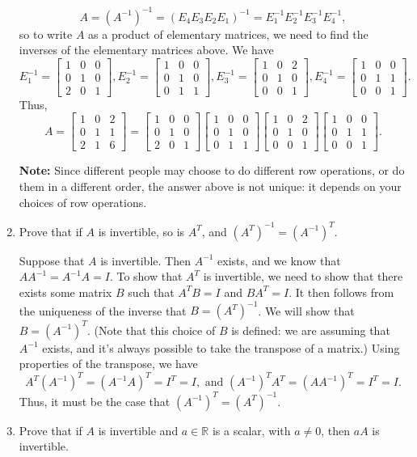 \documentclass[12pt]{article}
\newcommand{\R}{\mathbb{R}}
\newcommand{\bbm}{\begin{bmatrix}}
\newcommand{\ebm}{\end{bmatrix}}
\begin{document}
\begin{enumerate}
\[
 A = (A^{-1})^{-1} = (E_4E_3E_2E_1)^{-1} = E_1^{-1}E_2^{-1}E_3^{-1}E_4^{-1},
\]
so to write $A$ as a product of elementary matrices, we need to find the inverses of the elementary matrices above. We have
\[
 E_1^{-1} = \bbm 1&0&0\\0&1&0\\2&0&1\ebm, E_2^{-1} = \bbm 1&0&0\\0&1&0\\0&1&1\ebm, E_3^{-1} = \bbm 1&0&2\\0&1&0\\0&0&1\ebm, E_4^{-1} = \bbm 1&0&0\\0&1&1\\0&0&1\ebm.
\]
Thus,
\[
 A = \bbm 1&0&2\\0&1&1\\2&1&6\ebm = \bbm 1&0&0\\0&1&0\\2&0&1\ebm \bbm 1&0&0\\0&1&0\\0&1&1\ebm \bbm 1&0&2\\0&1&0\\0&0&1\ebm \bbm 1&0&0\\0&1&1\\0&0&1\ebm.
\]

\textbf{Note:}  Since different people may choose to do different row operations, or do them in a different order, the answer above is not unique: it depends on your choices of row operations.


\item Prove that if $A$ is invertible, so is $A^T$, and $(A^T)^{-1} = (A^{-1})^T$.

\medskip

Suppose that $A$ is invertible. Then $A^{-1}$ exists, and we know that $AA^{-1}=A^{-1}A=I$. To show that $A^T$ is invertible, we need to show that there exists some matrix $B$ such that $A^TB = I$ and $BA^T=I$. It then follows from the uniqueness of the inverse that $B=(A^T)^{-1}$. We will show that $B=(A^{-1})^T$. (Note that this choice of $B$ is defined: we are assuming that $A^{-1}$ exists, and it's always possible to take the transpose of a matrix.) Using properties of the transpose, we have
\[
 A^T(A^{-1})^T = (A^{-1}A)^T = I^T=I, \text{ and } (A^{-1})^TA^T = (AA^{-1})^T = I^T = I.
\]
Thus, it must be the case that $(A^{-1})^T = (A^T)^{-1}$.


\item Prove that if $A$ is invertible and $a\in\R$ is a scalar, with $a\neq 0$, then $aA$ is invertible.


\end{enumerate}
\end{document}
